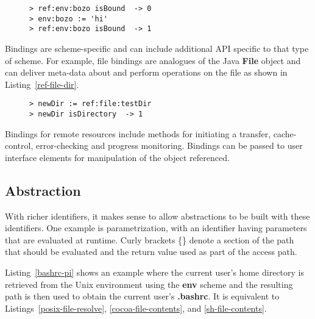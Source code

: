 \documentclass[preprint,authoryear]{acm_proc_article-sp}
\begin{document}
\begin{figure}[htbp]
\begin{lstlisting}[style=L,label=isBound,caption=Is environment variable set?]
> ref:env:bozo isBound  -> 0
> env:bozo := 'hi'
> ref:env:bozo isBound  -> 1
\end{lstlisting}
\end{figure}

Bindings are scheme-specific and can include additional API specific to that type of scheme.
For example, file bindings are analogues of the Java {\bf File} object and can deliver
meta-data about and perform operations on the file as shown in Listing~\ref{ref-file-dir}.


\begin{figure}[htbp]
\begin{lstlisting}[style=L,label=ref-file-dir,caption=File and directory manipulation.]
> newDir := ref:file:testDir 
> newDir isDirectory  -> 1
\end{lstlisting}
\end{figure}

Bindings for remote resources include methods for initiating a transfer, cache-control,
error-checking and progress monitoring.   Bindings can be passed to user interface
elements for manipulation of the object referenced.


\subsection{Abstraction}

With richer identifiers, it makes sense to allow abstractions to be built with these identifiers.
One example is parametrization, with an identifier having parameters that are evaluated
at runtime.  Curly brackets \{\} denote a section of the path that should be evaluated and
the return value used as part of the access path.

Listing~\ref{bashrc-pi} shows an example where the current user's home directory
is retrieved from the Unix environment using the {\bf env} scheme and the resulting
path is then used to obtain the current user's  {\bf .bashrc}.
It is equivalent to Listings~\ref{posix-file-resolve}, \ref{cocoa-file-contents}, and 
\ref{sh-file-contents}.
\end{document}
